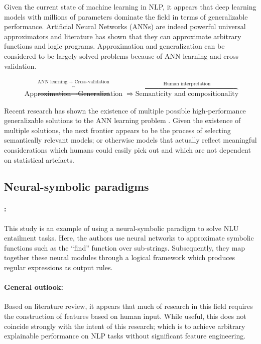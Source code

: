 Given the current state of machine learning in NLP, it appears that deep learning models with millions of parameters dominate the field in terms of generalizable performance. Artificial Neural Networks (ANNs) are indeed powerful universal approximators and literature has shown that they can approximate arbitrary functions and logic programs. Approximation and generalization can be considered to be largely solved problems because of ANN learning and cross-validation.

\begin{gather}
  \overbrace{\text{Approximation} \Rightarrow \text{Generalization}}^{\text{ANN learning + Cross-validation}} \Rightarrow \overbrace{\text{Semanticity and compositionality}}^{\text{Human interpretation}}
\end{gather}

Recent research has shown the existence of multiple possible high-performance generalizable solutions to the ANN learning problem \citep{kepner2018sparse}. Given the existence of multiple solutions, the next frontier appears to be the process of selecting semantically relevant models; or otherwise models that actually reflect meaningful considerations which humans could easily pick out and which are not dependent on statistical artefacts.

\subsection{Neural-symbolic paradigms}

\paragraph{\citealt{li2018generalize}:} This study is an example of using a neural-symbolic paradigm to solve NLU entailment tasks. Here, the authors use neural networks to approximate symbolic functions such as the ``find'' function over sub-strings. Subsequently, they map together these neural modules through a logical framework which produces regular expressions as output rules.

\paragraph{General outlook:} Based on literature review, it appears that much of research in this field requires the construction of features based on human input. While useful, this does not coincide strongly with the intent of this research; which is to achieve arbitrary explainable performance on NLP tasks without significant feature engineering.

